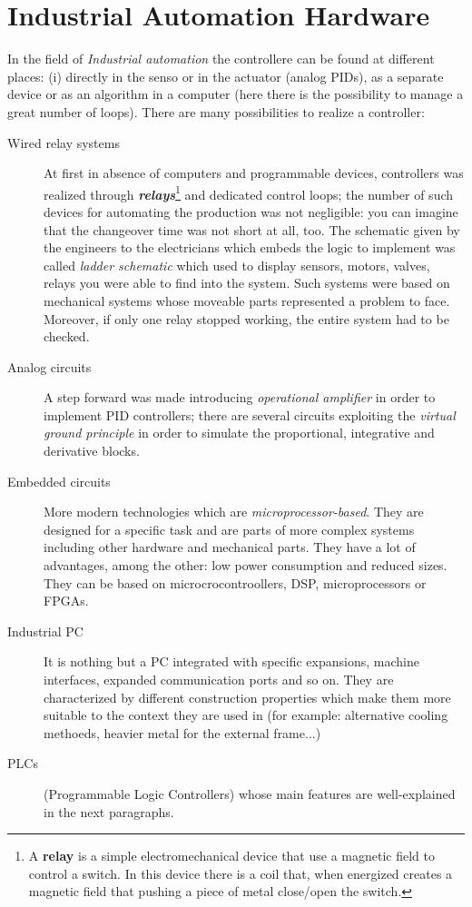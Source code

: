 \section{Industrial Automation Hardware}
In the field of \textit{Industrial automation} the controllere can be found at different places: (i) directly in the senso or in the actuator (analog PIDs), as a separate device or as an algorithm in a computer (here there is the possibility to manage a great number of loops). There are many possibilities to realize a controller: 
\begin{description}
    \item[Wired relay systems] At first in absence of computers and programmable devices, controllers was realized through \textit{\textbf{relays}}\footnote{
        A \textbf{relay} is a simple electromechanical device that use a magnetic field to control a switch. In this device there is a coil that, when energized creates a magnetic field that pushing a piece of metal close/open the switch.
    } and dedicated control loops; the number of such devices for automating the production was not negligible: you can imagine that the changeover time was not short at all, too. The schematic given by the engineers to the electricians which embeds the logic to implement was called \textit{ladder schematic} which used to display sensors, motors, valves, relays you were able to find into the system. Such systems were based on mechanical systems whose moveable parts represented a problem to face. Moreover, if only one relay stopped working, the entire system had to be checked.
    \item[Analog circuits] A step forward was made introducing \textit{operational amplifier} in order to implement PID controllers; there are several circuits exploiting the \textit{virtual ground principle} in order to simulate the proportional, integrative and derivative blocks.   
    \item[Embedded circuits] More modern technologies which are \textit{microprocessor-based}. They are designed for a specific task and are parts of more complex systems including other hardware and mechanical parts. They have a lot of advantages, among the other: low power consumption and reduced sizes. They can be based on microcrocontroollers, DSP, microprocessors or FPGAs.
    \item[Industrial PC] It is nothing but a PC integrated with specific expansions, machine interfaces, expanded communication ports and so on. They are characterized by different construction properties which make them more suitable to the context they are used in (for example: alternative cooling methoeds, heavier metal for the external frame...)
    \item[PLCs] (Programmable Logic Controllers) whose main features are well-explained in the next paragraphs. 
\end{description}

